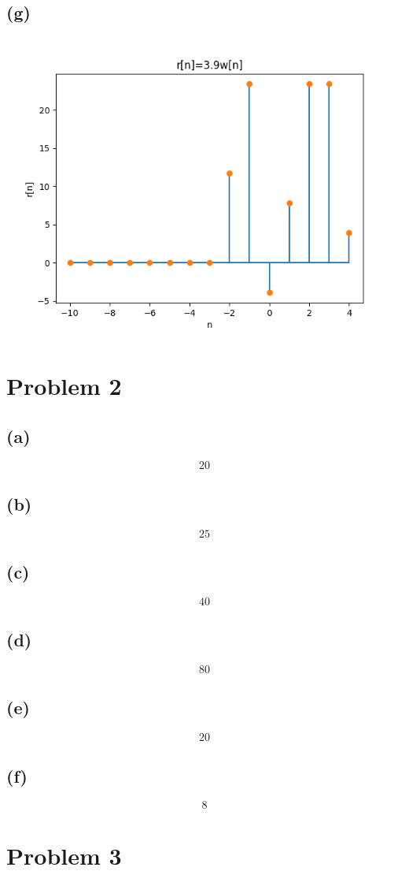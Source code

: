 \subsection*{(g)}
\includegraphics[scale=0.5]{r.png}
\section*{Problem 2}
\subsection*{(a)}
$$\boxed{20}$$
\subsection*{(b)}
$$\boxed{25}$$
\subsection*{(c)}
$$\boxed{40}$$
\subsection*{(d)}
$$\boxed{80}$$
\subsection*{(e)}
$$\boxed{20}$$
\subsection*{(f)}
$$\boxed{8}$$
\section*{Problem 3}
